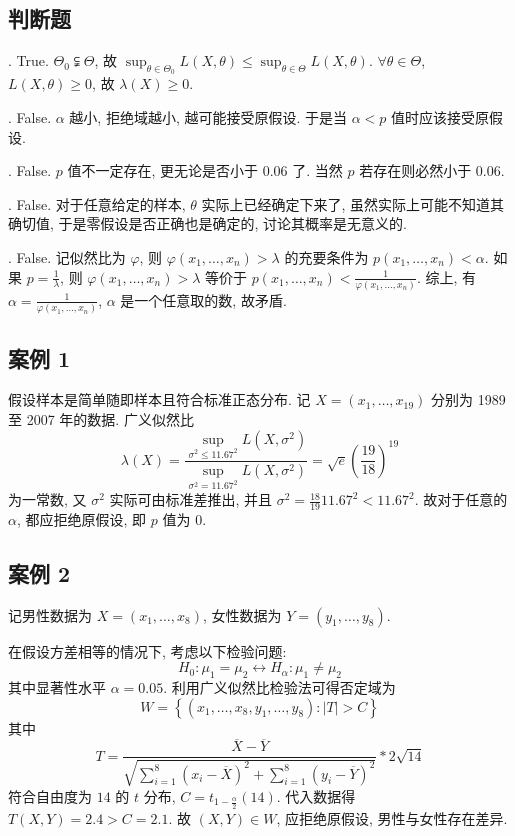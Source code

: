 \documentclass[../main.tex]{subfiles}
\begin{document}
\subsection{判断题}
.
True. $\Theta_0 \subsetneqq \Theta$,
故 $\sup_{\theta \in \Theta_0} L \left( X, \theta \right)
\leqslant \sup_{\theta \in \Theta} L \left( X, \theta \right)$.
$\forall \theta \in \Theta$, $L \left( X, \theta \right) \geqslant 0$, 故 $\lambda \left( X \right) \geqslant 0$.

.
False. $\alpha$ 越小, 拒绝域越小, 越可能接受原假设.
于是当 $\alpha < p$ 值时应该接受原假设. 

.
False. $p$ 值不一定存在, 更无论是否小于 $0.06$ 了. 当然 $p$ 若存在则必然小于 $0.06$.

.
False. 对于任意给定的样本, $\theta$ 实际上已经确定下来了, 虽然实际上可能不知道其确切值, 于是零假设是否正确也是确定的, 讨论其概率是无意义的.

.
False. 记似然比为 $\varphi$, 则 $\varphi \left( x_1, \dots, x_n \right) > \lambda$ 的充要条件为 $p \left( x_1, \dots , x_n \right) < \alpha$.
如果 $p = \frac{1}{\lambda}$, 则 $\varphi \left( x_1, \dots, x_n \right) > \lambda$ 等价于 $p \left( x_1, \dots, x_n \right) < \frac{1}{\varphi \left( x_1, \dots, x_n \right)}$.
综上, 有 $\alpha = \frac{1}{\varphi \left( x_1, \dots, x_n \right)}$, $\alpha$ 是一个任意取的数, 故矛盾.

\subsection{案例 1}
假设样本是简单随即样本且符合标准正态分布.
记 $X = \left( x_1, \dots, x_{19} \right)$ 分别为 1989 至 2007 年的数据.
广义似然比
\[
    \lambda \left( X \right)
    = \frac{\displaystyle\sup_{\sigma^2 \leqslant 11.67^2} L \left( X, \sigma^2 \right)}{\displaystyle\sup_{\sigma^2 = 11.67^2} L \left( X, \sigma^2 \right)}
    = \sqrt{e} \left( \frac{19}{18} \right)^{19}
\]
为一常数, 又 $\sigma^2$ 实际可由标准差推出, 并且 $\sigma^2 = \frac{18}{19} 11.67^2 < 11.67^2$.
故对于任意的 $\alpha$, 都应拒绝原假设, 即 $p$ 值为 $0$.

\subsection{案例 2}
记男性数据为 $X = \left( x_1, \dots, x_8 \right)$, 女性数据为 $Y = \left( y_1, \dots, y_8 \right)$.

在假设方差相等的情况下, 考虑以下检验问题:
\[
    H_0: \mu_1 = \mu_2 \leftrightarrow H_\alpha: \mu_1 \neq \mu_2
\]
其中显著性水平 $\alpha = 0.05$.
利用广义似然比检验法可得否定域为
\[
    W = \left\{
        \left( x_1, \dots, x_8, y_1, \dots, y_8 \right) : \left| T \right| > C
    \right\}
\]
其中
\[
    T = \frac{\overline{X} - \overline{Y}}{\sqrt{\sum_{i = 1}^{8} \left( x_i - \overline{X} \right)^2 + \sum_{i = 1}^{8} \left( y_i - \overline{Y} \right)^2}} * 2 \sqrt{14}
\]
符合自由度为 $14$ 的 $t$ 分布, $C = t_{1 - \frac{\alpha}{2}} \left( 14 \right)$.
代入数据得 $T \left( X, Y \right) = 2.4 > C = 2.1$.
故 $(X, Y) \in W$, 应拒绝原假设, 男性与女性存在差异.
\end{document}
